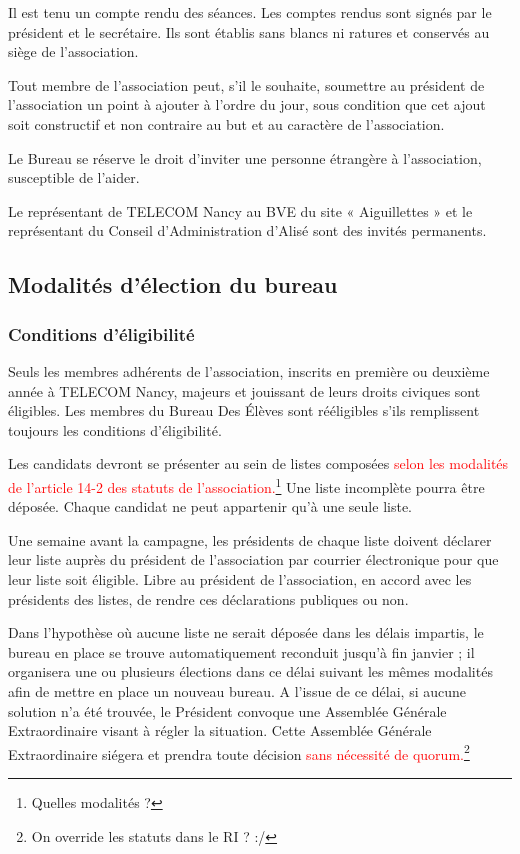 \documentclass{article} %
\begin{document}
				Il est tenu un compte rendu des séances. Les comptes rendus sont
				signés par le président et le secrétaire. Ils sont établis sans
				blancs ni ratures et conservés au siège de l’association.

				Tout membre de l’association peut, s’il le souhaite, soumettre
				au président de l’association un point à ajouter à l’ordre du
				jour, sous condition que cet ajout soit constructif et non
				contraire au but et au caractère de l’association.

				Le Bureau se réserve le droit d’inviter une personne étrangère à
				l’association, susceptible de l’aider. 

				Le représentant de TELECOM Nancy au BVE du site « Aiguillettes »
				et le représentant du Conseil d’Administration d’Alisé sont des
				invités permanents.

		\subsection{Modalités d’élection du bureau}

			\subsubsection{Conditions d’éligibilité}
					
				Seuls les membres adhérents de l'association, inscrits en
				première ou deuxième année à TELECOM Nancy, majeurs et jouissant
				de leurs droits civiques sont éligibles. Les membres du Bureau
				Des Élèves sont rééligibles s’ils remplissent toujours les
				conditions d’éligibilité.

				Les candidats devront se présenter au sein de listes composées
				\textcolor{red}{selon les modalités de l’article 14-2 des
				statuts de l’association.}\footnote{Quelles modalités ?}  Une
				liste incomplète pourra être déposée. Chaque candidat ne peut
				appartenir qu’à une seule liste.

				Une semaine avant la campagne, les présidents de chaque liste
				doivent déclarer leur liste auprès du président de l’association
				par courrier électronique pour que leur liste soit éligible.
				Libre au président de l’association, en accord avec les
				présidents des listes, de rendre ces déclarations publiques ou
				non.

				Dans l’hypothèse où aucune liste ne serait déposée dans les
				délais impartis, le bureau en place se trouve automatiquement
				reconduit jusqu’à fin janvier ; il organisera une ou plusieurs
				élections dans ce délai suivant les mêmes modalités afin de
				mettre en place un nouveau bureau. A l’issue de ce délai, si
				aucune solution n’a été trouvée, le Président convoque une
				Assemblée Générale Extraordinaire visant à régler la situation.
				Cette Assemblée Générale Extraordinaire siégera et prendra toute
				décision \textcolor{red}{sans nécessité de quorum.}\footnote{On
				override les statuts dans le RI ? :/}
\end{document}
